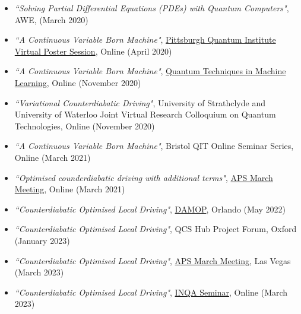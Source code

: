 \begin{itemize}
    \item \textit{``Solving Partial Differential Equations (PDEs) with Quantum Computers"}, AWE, (March 2020)
    \item \textit{``A Continuous Variable Born Machine"}, \href{https://www.youtube.com/live/ImQeEs0BcQs?feature=share&t=1996}{Pittsburgh Quantum Institute Virtual Poster Session}, Online (April 2020)
    \item \textit{``A Continuous Variable Born Machine"}, \href{https://www.youtube.com/watch?v=6v1IiXRToPU&t=3685s}{Quantum Techniques in Machine Learning}, Online (November 2020)
    \item \textit{``Variational Counterdiabatic Driving"}, University of Strathclyde and University of Waterloo Joint Virtual Research Colloquium on Quantum Technologies, Online (November 2020)
    \item \textit{``A Continuous Variable Born Machine"}, Bristol QIT Online Seminar Series, Online (March 2021)
    \item \textit{``Optimised counderdiabatic driving with additional terms"}, \href{https://meetings.aps.org/Meeting/MAR21/Session/S21.8}{APS March Meeting}, Online (March 2021)
    \item \textit{``Counterdiabatic Optimised Local Driving"}, \href{https://www.youtube.com/watch?v=YkoCPIlFl70}{DAMOP}, Orlando (May 2022)
    \item \textit{``Counterdiabatic Optimised Local Driving"}, QCS Hub Project Forum, Oxford (January 2023)
    \item \textit{``Counterdiabatic Optimised Local Driving"}, \href{https://meetings.aps.org/Meeting/MAR23/Session/Q71.8}{APS March Meeting}, Las Vegas (March 2023)
    \item \textit{``Counterdiabatic Optimised Local Driving"}, \href{https://youtu.be/-btmXDNaQX4}{INQA Seminar}, Online (March 2023)
\end{itemize}